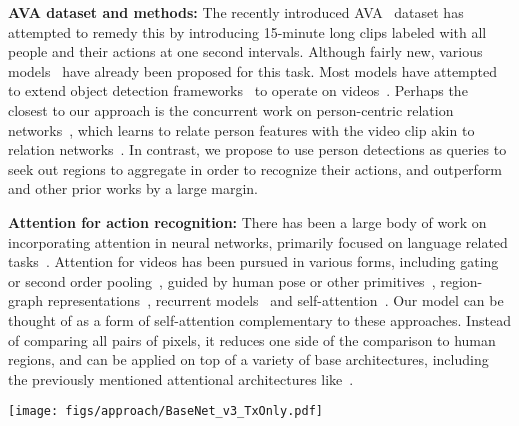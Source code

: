 \documentclass[10pt,twocolumn,letterpaper]{article}
\newcommand{\tx}[0]{Action Transformer}
\newcommand{\QPr}[0]{QPr}
\begin{document}
{\noindent \bf AVA dataset and methods:} The recently introduced AVA~\cite{gu2018ava} dataset has attempted to remedy this by introducing 15-minute long clips labeled with all people and their actions at one second intervals. Although fairly new, various models~\cite{gu2018ava,sun2018arcn,tsinghua_ava,yh_ava_submit} have already been proposed for this task. Most models have attempted to extend object detection frameworks~\cite{he2017mask,ren2015faster,huang2017speed} to operate on videos~\cite{hou2017tube,kalogeiton2017action,girdhar2018detecttrack}. Perhaps the closest to our approach is the concurrent work on person-centric relation networks~\cite{sun2018arcn}, which learns to relate person features with the video clip akin to relation networks~\cite{santoro2017simple}. In contrast, we propose to use person
detections  as queries to seek out regions to aggregate in order to recognize their actions, and outperform~\cite{sun2018arcn} and other prior works by a large margin.

{\noindent \bf Attention for action recognition:}
There has been a large body of work on incorporating attention in neural networks, primarily focused on language related tasks~\cite{vaswani2017attention,xu2015show}. Attention for videos has been pursued in various forms, including gating or second order pooling~\cite{xie2017rethinking,Girdhar_17b_AttentionalPoolingAction,long2018attention,miech17loupe}, guided by human pose or other primitives~\cite{Baradel_2018_BMVC,Girdhar_17a_ActionVLAD,baradel2017human,Girdhar_17b_AttentionalPoolingAction}, region-graph representations~\cite{herzig2018classifying,wang2018spacetime}, recurrent models~\cite{sharma2015attention} and self-attention~\cite{wang2017non}. Our model can be thought of as a form of self-attention complementary to these approaches.
Instead of comparing all pairs of pixels, it reduces one side of the comparison to human regions, 
and can be applied on top of a variety of base architectures, including the previously mentioned attentional architectures like~\cite{wang2017non}.
\begin{figure*}[t]
\centering
\texttt{[image: figs/approach/BaseNet\_v3\_TxOnly.pdf]}
\caption{
{\bf Base Network Architecture.}
Our model takes a clip as input and generates a spatio-temporal feature representation using a trunk network, typically the initial layers of I3D. The center frame of the feature map is passed through an RPN to generate bounding box proposals, and the feature map (padded with location embedding) and each proposal are passed through `head' networks to obtain a feature for the proposal. This feature is then used to regress a tight bounding box and classify into action classes.
The head network consists of a stack of \tx{} (Tx) units, which generates the features to be classified. We also visualize the Tx unit zoomed in, as described in Section~\ref{sec:app:tx_head}.
\QPr{} and FFN refer to Query Preprocessor and a Feed-forward Network respectively, also explained Section~\ref{sec:app:tx_head}.
}\label{fig:base_arch}
\end{figure*}
\end{document}
